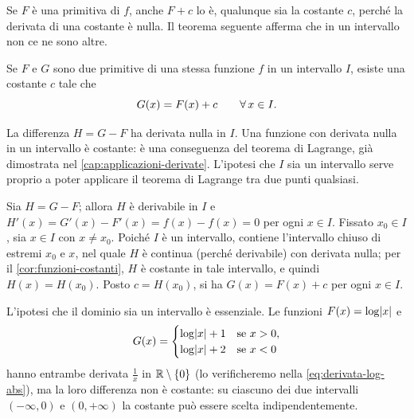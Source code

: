 Se $F$ è una primitiva di $f$, anche $F+c$ lo è, qualunque sia la costante $c$, perché la
derivata di una costante è nulla. Il teorema seguente afferma che in un intervallo non
ce ne sono altre.

\begin{teorema}
\label{teo:caratterizzazione-primitive}
Se $F$ e $G$ sono due primitive di una stessa funzione $f$ in un intervallo $I$, esiste
una costante $c$ tale che
\begin{equation}\label{eq:primitive-costante}
  G(x)=F(x)+c \qquad\forall\, x\in I .
\end{equation}
\end{teorema}

\begin{schema}
\end{schema}

\begin{strategia}
La differenza $H=G-F$ ha derivata nulla in $I$. Una funzione con derivata nulla in un
intervallo è costante: è una conseguenza del teorema di Lagrange, già dimostrata nel
\cref{cap:applicazioni-derivate}. L'ipotesi che $I$ sia un intervallo serve proprio a
poter applicare il teorema di Lagrange tra due punti qualsiasi.
\end{strategia}

\begin{dimostrazione}
Sia $H=G-F$; allora $H$ è derivabile in $I$ e $H'(x)=G'(x)-F'(x)=f(x)-f(x)=0$ per ogni
$x\in I$. Fissato $x_{0}\in I$, sia $x\in I$ con $x\neq x_{0}$. Poiché $I$ è un intervallo,
contiene l'intervallo chiuso di estremi $x_{0}$ e $x$, nel quale $H$ è continua (perché
derivabile) con derivata nulla; per il \cref{cor:funzioni-costanti}, $H$ è costante in
tale intervallo, e quindi $H(x)=H(x_{0})$. Posto $c=H(x_{0})$, si ha $G(x)=F(x)+c$ per ogni
$x\in I$.
\end{dimostrazione}

L'ipotesi che il dominio sia un intervallo è essenziale. Le funzioni $F(x)=\log\lvert x\rvert$ e
\[
  G(x)=\begin{cases} \log\lvert x\rvert+1 & \text{se } x>0,\\ \log\lvert x\rvert+2 & \text{se } x<0 \end{cases}
\]
hanno entrambe derivata $\frac1x$ in $\mathbb{R}\setminus\left\{ 0 \right\}$ (lo verificheremo nella
\eqref{eq:derivata-log-abs}), ma la loro differenza non è costante: su ciascuno dei due
intervalli $(-\infty,0)$ e $(0,+\infty)$ la costante può essere scelta indipendentemente.

